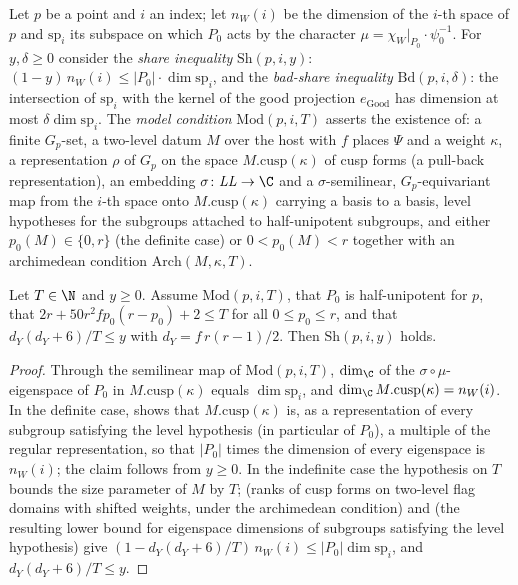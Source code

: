 Let $p$ be a point and $i$ an index; let $n_W(i)$ be the dimension of the $i$-th space of $p$ and $\mathrm{sp}_i$ its
subspace on which $P_0$ acts by the character $\mu=\chi_W|_{P_0}\cdot\psi_0^{-1}$. For $y,\delta\ge0$ consider the
\emph{share inequality} $\mathrm{Sh}(p,i,y)$: $(1-y)\,n_W(i)\le|P_0|\cdot\dim\mathrm{sp}_i$, and the \emph{bad-share
inequality} $\mathrm{Bd}(p,i,\delta)$: the intersection of $\mathrm{sp}_i$ with the kernel of the good projection
$e_{\mathrm{Good}}$ has dimension at most $\delta\dim\mathrm{sp}_i$. The \emph{model condition}
$\mathrm{Mod}(p,i,T)$ asserts the existence of: a finite $G_p$-set, a two-level datum $M$ over the host with $f$
places $\Psi$ and a weight $\kappa$, a representation $\rho$ of $G_p$ on the space $M.\mathrm{cusp}(\kappa)$ of cusp
forms (a pull-back representation), an embedding $\sigma\colon\mathit{LL}\to\C$ and a $\sigma$-semilinear,
$G_p$-equivariant map from the $i$-th space onto $M.\mathrm{cusp}(\kappa)$ carrying a basis to a basis, level
hypotheses for the subgroups attached to half-unipotent subgroups, and either $p_0(M)\in\{0,r\}$ (the definite
case) or $0<p_0(M)<r$ together with an archimedean condition $\mathrm{Arch}(M,\kappa,T)$.

\begin{lemma}\label{pf:onto3:sharemodel}
Let $T\in\N$ and $y\ge0$. Assume $\mathrm{Mod}(p,i,T)$, that $P_0$ is half-unipotent for $p$, that
$2r+50r^2fp_0(r-p_0)+2\le T$ for all $0\le p_0\le r$, and that $d_Y(d_Y+6)/T\le y$ with $d_Y=f\,r(r-1)/2$. Then
$\mathrm{Sh}(p,i,y)$ holds.
\end{lemma}

\begin{proof}
Through the semilinear map of $\mathrm{Mod}(p,i,T)$, $\dim_\C$ of the $\sigma\circ\mu$-eigenspace of $P_0$ in
$M.\mathrm{cusp}(\kappa)$ equals $\dim\mathrm{sp}_i$, and $\dim_\C M.\mathrm{cusp}(\kappa)=n_W(i)$. In the definite
case,  shows that $M.\mathrm{cusp}(\kappa)$
is, as a representation of every subgroup satisfying the level hypothesis (in particular of $P_0$), a multiple of
the regular representation, so that $|P_0|$ times the dimension of every eigenspace is $n_W(i)$; the claim follows
from $y\ge0$. In the indefinite case the hypothesis on $T$ bounds the size parameter of $M$ by $T$;
 (ranks of cusp forms on two-level flag
domains with shifted weights, under the archimedean condition) and
 (the resulting lower bound for eigenspace dimensions
of subgroups satisfying the level hypothesis) give $(1-d_Y(d_Y+6)/T)\,n_W(i)\le|P_0|\dim\mathrm{sp}_i$, and
$d_Y(d_Y+6)/T\le y$.
\end{proof}

